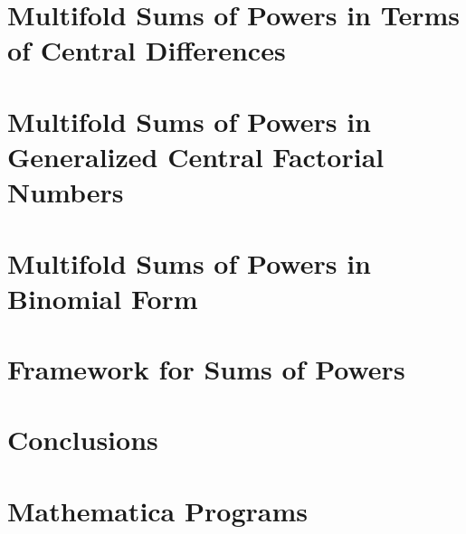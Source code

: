 \documentclass[12pt,letterpaper,oneside,reqno]{amsart}
\begin{document}
\section{Multifold Sums of Powers in Terms of Central Differences}


\section{Multifold Sums of Powers in Generalized Central Factorial Numbers}


\section{Multifold Sums of Powers in Binomial Form}


\section{Framework for Sums of Powers}


\section{Conclusions}




\clearpage

\section*{Mathematica Programs}


\clearpage


\end{document}
